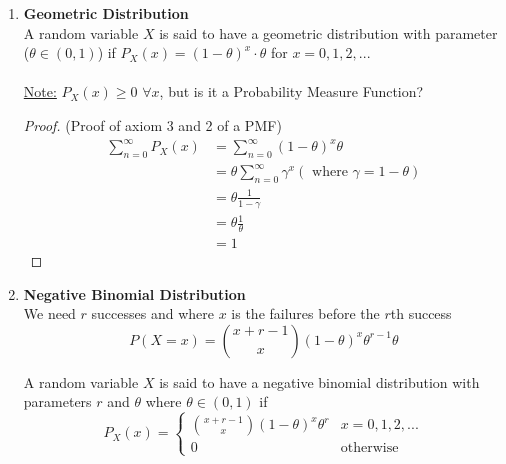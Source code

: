 \documentclass[12pt, twoside]{article}
\begin{document}
\begin{enumerate}
{\begin{proof}
	(Proof of (2.) in Note)\\
	\begin{align*}
		\sum_{x=0}^n P_X (x) &= \sum_{x=0}^n \binom{n}{x} \theta^x (1-\theta)^{n-x}\\
		&= (\theta + 1 - \theta)^n = 1^n = 1
	\end{align*}
	\underline{Recall that} $$(a+b)^n = \sum_{x=0}^n a^x b^{n-x}$$
\end{proof}
	
	}
	\item{
	\textbf{Geometric Distribution}\\
	A random variable $X$ is said to have a geometric distribution with parameter ($\theta \in (0,1)$) if $P_X (x) = (1 - \theta)^x \cdot \theta$ for $x = 0,1,2,...$\\
	\\
	\underline{Note:} $P_X (x) \geq 0$ $\forall x$, but is it a Probability Measure Function?\\
	\begin{proof}
	(Proof of axiom 3 and 2 of a PMF)\\
	\begin{align*}
		\sum_{n=0}^{\infty} P_X (x) &= \sum_{n=0}^{\infty} (1 - \theta)^x \theta\\
		&= \theta \sum_{n=0}^{\infty} \gamma^x (\text{ where } \gamma = 1 - \theta)\\
		&= \theta \frac{1}{1 - \gamma}\\
		&=\theta \frac{1}{\theta}\\
		&= 1
	\end{align*}
	\end{proof}
	}
	\item{
	\textbf{Negative Binomial Distribution}\\
	We need $r$ successes and where $x$ is the failures before the $r$th success
	$$P(X = x) = \binom{x+r - 1}{x} (1 - \theta)^x \theta^{r-1} \theta$$
	
	A random variable $X$ is said to have a negative binomial distribution with parameters $r$ and $\theta$ where $\theta \in (0,1)$ if\\
	$$P_X (x) = 
	\begin{cases}
		\binom{x+r - 1}{x} (1 - \theta)^x \theta^{r} & x = 0,1,2,...\\
		0 & \text{otherwise}
	\end{cases}$$
	}
\end{enumerate}

\newpage
\end{document}
